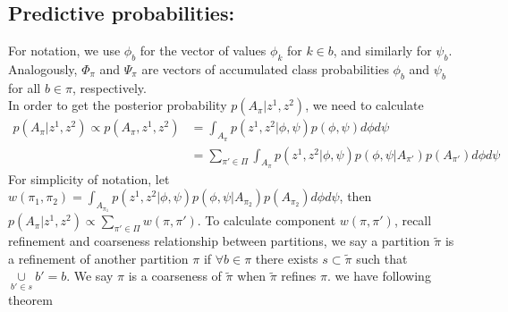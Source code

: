 \documentclass[11pt]{amsart}
\begin{document}
\subsection{Predictive probabilities:}
For notation, we use $\phi_b$ for the vector of values $\phi_k$ for $k \in b$,
and similarly for $\psi_b$. Analogously, $\Phi_\pi$ and $\Psi_\pi$
 are vectors of 
accumulated class probabilities $\phi_b$ and $\psi_b$ for all $b \in \pi$,
 respectively. \\
In order to get the posterior probability $p(A_\pi | z^1,z^2)$, we need to calculate 
\[
\begin{split}
p(A_\pi | z^1,z^2)\propto p(A_\pi, z^1,z^2) &= \int_{A_\pi} p(z^1,z^2|\phi,\psi)p(\phi,\psi) d\phi d\psi\\ 
&= \sum_{\pi'\in \Pi}\int_{A_\pi} p(z^1,z^2|\phi,\psi)p(\phi, \psi | A_{\pi'})p(A_{\pi'})d\phi d\psi
\end{split}
\]
For simplicity of notation, let $w(\pi_1, \pi_2) = \int_{A_{\pi_1}} p(z^1,z^2|\phi,\psi)p(\phi, \psi | A_{\pi_2})p(A_{\pi_2})d\phi d\psi$, then 
$p(A_\pi | z^1,z^2)\propto \underset{\pi'\in \Pi}\sum w(\pi, \pi')$. To calculate component $w(\pi, \pi')$, recall refinement and coarseness relationship between partitions, we say a partition $\tilde{\pi}$ is a refinement of another partition $\pi$ if $\forall b \in \pi$ there exists $s \subset \tilde{\pi}$  such that $\underset{b'\in s}\cup b' = b$. We say $\pi$ is a coarseness of $\tilde{\pi}$ when $\tilde{\pi}$ refines $\pi$. we have following theorem
\end{document}
